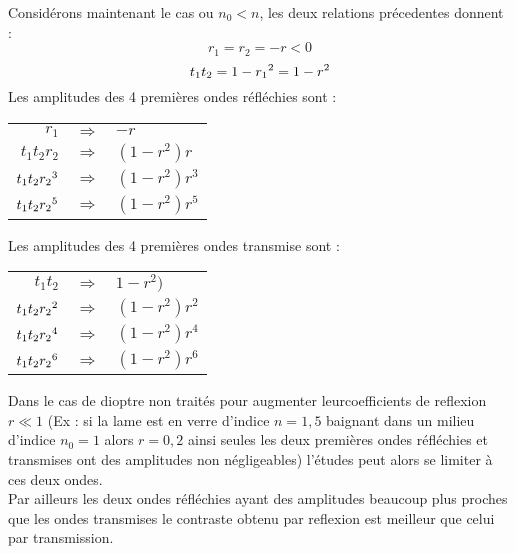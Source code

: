 \documentclass[a4paper,12pt]{article}
\theoremstyle{StyleTheo_will}
\theoremstyle{remark}
\begin{document}
Considérons maintenant le cas ou $n_0<n$, les deux relations précedentes donnent : 
\[r_1 = r_2 = -r < 0 \]
\[ t_1t_2 = 1 - r_1\verb||^2 = 1 - r^2 \]
Les amplitudes des 4 premières ondes réfléchies sont :

\begin{center}
  \begin{tabular}{r c l}
    $r_1$               & $\Rightarrow$ & $-r$ \\
    $t_1t_2r_2$         & $\Rightarrow$ & $(1 - r^2)r$ \\
    $t_1t_2r_2\verb||^3$& $\Rightarrow$ & $(1 - r^2)r^3$\\
    $t_1t_2r_2\verb||^5$& $\Rightarrow$ & $(1 - r^2)r^5$
  \end{tabular}
\end{center}

Les amplitudes des 4 premières ondes transmise sont : 

\begin{center}
  \begin{tabular}{r c l}
    $t_1t_2$            & $\Rightarrow$ & $1 - r^2)$ \\
    $t_1t_2r_2\verb||^2$& $\Rightarrow$ & $(1 - r^2)r^2$ \\
    $t_1t_2r_2\verb||^4$& $\Rightarrow$ & $(1 - r^2)r^4$\\
    $t_1t_2r_2\verb||^6$& $\Rightarrow$ & $(1 - r^2)r^6$
  \end{tabular}
\end{center}

Dans le cas de dioptre non traités pour augmenter leurcoefficients de reflexion $r \ll 1$ (Ex  : si la lame est en verre d'indice $n = 1,5$ baignant dans un milieu d'indice $n_0 = 1$ alors $r = 0,2$ ainsi seules les deux premières ondes réfléchies et transmises ont des amplitudes non négligeables) l'études peut alors se limiter à ces deux ondes. \\ Par ailleurs les deux ondes réfléchies ayant des amplitudes beaucoup plus proches que les ondes transmises le contraste obtenu par reflexion est meilleur que celui par transmission.
\end{document}
